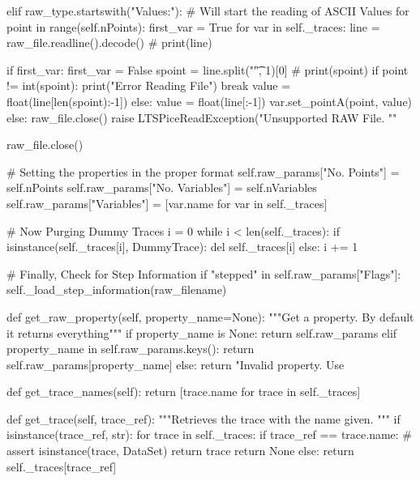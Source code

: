        elif raw_type.startswith("Values:"):
            # Will start the reading of ASCII Values
            for point in range(self.nPoints):
                first_var = True
                for var in self._traces:
                    line = raw_file.readline().decode()
                    # print(line)

                    if first_var:
                        first_var = False
                        spoint = line.split("\t", 1)[0]
                        # print(spoint)
                        if point != int(spoint):
                            print("Error Reading File")
                            break
                        value = float(line[len(spoint):-1])
                    else:
                        value = float(line[:-1])
                    var.set_pointA(point, value)
        else:
            raw_file.close()
            raise LTSPiceReadException("Unsupported RAW File. ""%

        raw_file.close()

        # Setting the properties in the proper format
        self.raw_params["No. Points"] = self.nPoints
        self.raw_params["No. Variables"] = self.nVariables
        self.raw_params["Variables"] = [var.name for var in self._traces]

        # Now Purging Dummy Traces
        i = 0
        while i < len(self._traces):
            if isinstance(self._traces[i], DummyTrace):
                del self._traces[i]
            else:
                i += 1

        # Finally, Check for Step Information
        if "stepped" in self.raw_params["Flags"]:
            self._load_step_information(raw_filename)

    def get_raw_property(self, property_name=None):
        """Get a property. By default it returns everything"""
        if property_name is None:
            return self.raw_params
        elif property_name in self.raw_params.keys():
            return self.raw_params[property_name]
        else:
            return "Invalid property. Use %

    def get_trace_names(self):
        return [trace.name for trace in self._traces]

    def get_trace(self, trace_ref):
        """Retrieves the trace with the name given. """
        if isinstance(trace_ref, str):
            for trace in self._traces:
                if trace_ref == trace.name:
                    # assert isinstance(trace, DataSet)
                    return trace
            return None
        else:
            return self._traces[trace_ref]


